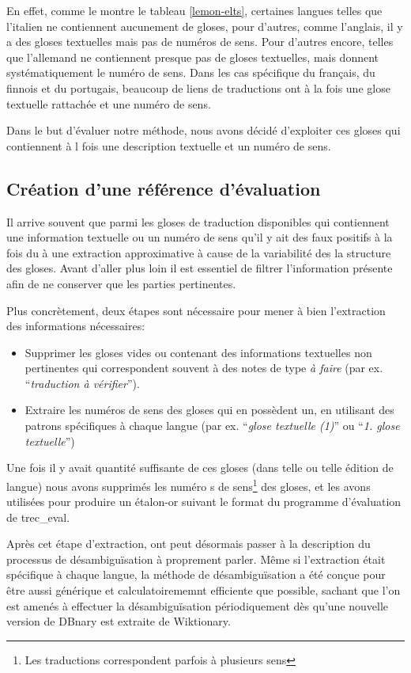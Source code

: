 \documentclass[10pt,a4paper,twoside]{article}
\begin{document}
En effet, comme le montre le tableau \ref{lemon-elts}, certaines langues telles que l'italien ne contiennent aucunement de gloses, pour d'autres, comme l'anglais, il y a des gloses textuelles mais pas de numéros de sens. Pour d'autres encore, telles que l'allemand ne contiennent presque pas de gloses textuelles, mais donnent systématiquement le numéro de sens. Dans les cas spécifique du français, du finnois et du portugais, beaucoup de liens de traductions ont à la fois une glose textuelle rattachée et une numéro de sens.

Dans le but d'évaluer notre méthode, nous avons décidé d'exploiter ces gloses qui contiennent à l fois une description textuelle et un numéro de sens.


\subsection{Création d'une référence d'évaluation}
Il arrive souvent que parmi les gloses de traduction disponibles qui contiennent une information textuelle ou un numéro de sens qu'il y ait des faux positifs à la fois du à une extraction approximative à cause de la variabilité des la structure des gloses. Avant d'aller plus loin il est essentiel de filtrer l'information présente afin de ne conserver que les parties pertinentes.

Plus concrètement, deux étapes sont nécessaire pour mener à bien l'extraction des informations nécessaires:
\begin{itemize}
	\item Supprimer les gloses vides ou contenant des informations textuelles non pertinentes qui correspondent souvent à des notes de type \emph{à faire} (par ex. ``\emph{traduction à vérifier}'').
	\item Extraire les numéros de sens des gloses qui en possèdent un, en utilisant des patrons spécifiques à chaque langue (par ex. ``\emph{glose textuelle (1)}'' ou ``\emph{1. glose textuelle}'')
\end{itemize}


Une fois il y avait quantité suffisante de ces gloses (dans telle ou telle édition de langue) nous avons supprimés les numéro s de sens\footnote{Les traductions correspondent parfois à plusieurs sens} des gloses, et les avons utilisées pour produire un étalon-or suivant le format du programme d'évaluation de trec\_eval.

Après cet étape d'extraction, ont peut désormais passer à la description du processus de désambiguïsation à proprement parler. Même si l'extraction était spécifique à chaque langue, la méthode de désambiguïsation a été conçue pour être aussi générique et calculatoirememnt efficiente que possible, sachant que l'on est amenés à effectuer la désambiguïsation périodiquement dès qu'une nouvelle version de DBnary est extraite de Wiktionary.
\end{document}
